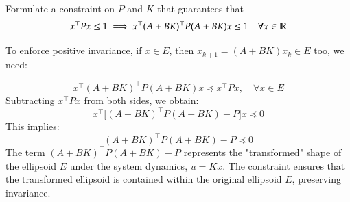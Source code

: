 \documentclass[]{article}
\begin{document}
\begin{assignment}
	Formulate a constraint on $P$ and $K$ that guarantees that 
	\[ 
		x^\top P x \leq 1 \implies x^\top(A + BK)^\top P (A + BK)x \leq 1  \quad \forall x \in \mathbb{R}
	\]
\end{assignment}
\begin{flushleft}
	To enforce positive invariance, if $x \in E$, then $x_{k+1} = (A + BK) x_k \in E$ too, we need:
\end{flushleft}
\begin{equation}
	x^\top(A + BK)^\top P (A + BK)x \preceq x^\top P x, \quad \forall x \in E
\end{equation}
Subtracting $x^\top P x$ from both sides, we obtain:
\begin{equation}
	x^\top\Big[ (A + BK)^\top P (A + BK) - P \Big] x \preceq 0
\end{equation}
This implies:
\begin{equation}
	(A + BK)^\top P (A + BK) - P \preceq 0
\end{equation}
The term $(A + BK)^\top P (A + BK) - P$ represents the "transformed" shape of the ellipsoid $E$ under the system dynamics, $u = Kx$. The constraint ensures that the transformed ellipsoid is contained within the original ellipsoid $E$, preserving invariance.
\end{document}
